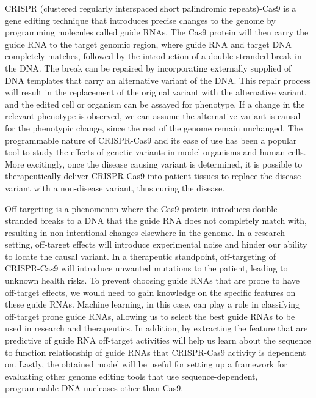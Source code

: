 \documentclass[10pt,twocolumn,letterpaper]{article}
\begin{document}
CRISPR (clustered regularly interspaced short palindromic repeats)-Cas9 is a gene editing technique that introduces precise changes to the genome by programming molecules called guide RNAs. The Cas9 protein will then carry the guide RNA to the target genomic region, where guide RNA and target DNA completely matches, followed by the introduction of a double-stranded break in the DNA. The break can be repaired by incorporating externally supplied of DNA templates that carry an alternative variant of the DNA. This repair process will result in the replacement of the original variant with the alternative variant, and the edited cell or organism can be assayed for phenotype. If a change in the relevant phenotype is observed, we can assume the alternative variant is causal for the phenotypic change, since the rest of the genome remain unchanged. The programmable nature of CRISPR-Cas9 and its ease of use has been a popular tool to study the effects of genetic variants in model organisms and human cells. More excitingly, once the disease causing variant is determined, it is possible to therapeutically deliver CRISPR-Cas9 into patient tissues to replace the disease variant with a non-disease variant, thus curing the disease.

Off-targeting is a phenomenon where the Cas9 protein introduces double-stranded breaks to a DNA that the guide RNA does not completely match with, resulting in non-intentional changes elsewhere in the genome. In a research setting, off-target effects will introduce experimental noise and hinder our ability to locate the causal variant. In a therapeutic standpoint, off-targeting of CRISPR-Cas9 will introduce unwanted mutations to the patient, leading to unknown health risks. To prevent choosing guide RNAs that are prone to have off-target effects, we would need to gain knowledge on the specific features on these guide RNAs. Machine learning, in this case, can play a role in classifying off-target prone guide RNAs, allowing us to select the best guide RNAs to be used in research and therapeutics. In addition, by extracting the feature that are predictive of guide RNA off-target activities will help us learn about the sequence to function relationship of guide RNAs that CRISPR-Cas9 activity is dependent on. Lastly, the obtained model will be useful for setting up a framework for evaluating other genome editing tools that use sequence-dependent, programmable DNA nucleases other than Cas9.
\end{document}
